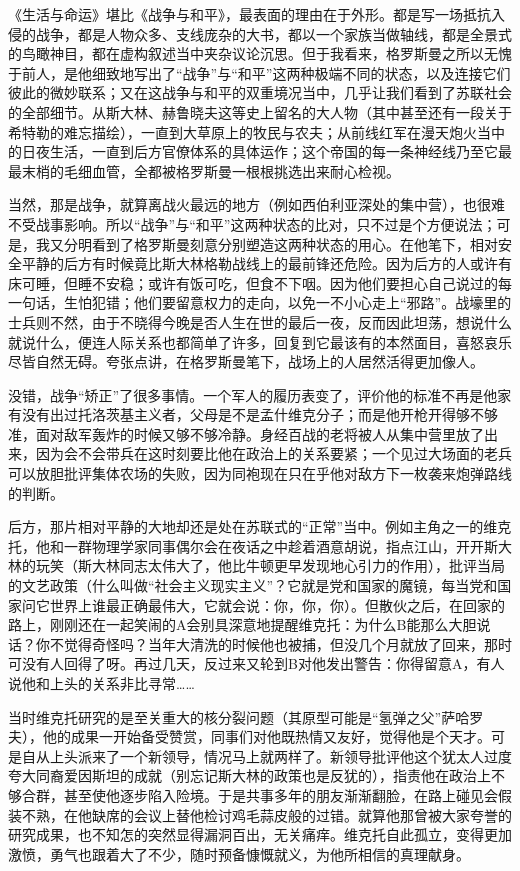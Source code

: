 《生活与命运》堪比《战争与和平》，最表面的理由在于外形。都是写一场抵抗入侵的战争，都是人物众多、支线庞杂的大书，都以一个家族当做轴线，都是全景式的鸟瞰神目，都在虚构叙述当中夹杂议论沉思。但于我看来，格罗斯曼之所以无愧于前人，是他细致地写出了“战争”与“和平”这两种极端不同的状态，以及连接它们彼此的微妙联系；又在这战争与和平的双重境况当中，几乎让我们看到了苏联社会的全部细节。从斯大林、赫鲁晓夫这等史上留名的大人物（其中甚至还有一段关于希特勒的难忘描绘），一直到大草原上的牧民与农夫；从前线红军在漫天炮火当中的日夜生活，一直到后方官僚体系的具体运作；这个帝国的每一条神经线乃至它最最末梢的毛细血管，全都被格罗斯曼一根根挑选出来耐心检视。

当然，那是战争，就算离战火最远的地方（例如西伯利亚深处的集中营），也很难不受战事影响。所以“战争”与“和平”这两种状态的比对，只不过是个方便说法；可是，我又分明看到了格罗斯曼刻意分别塑造这两种状态的用心。在他笔下，相对安全平静的后方有时候竟比斯大林格勒战线上的最前锋还危险。因为后方的人或许有床可睡，但睡不安稳；或许有饭可吃，但食不下咽。因为他们要担心自己说过的每一句话，生怕犯错；他们要留意权力的走向，以免一不小心走上“邪路”。战壕里的士兵则不然，由于不晓得今晚是否人生在世的最后一夜，反而因此坦荡，想说什么就说什么，便连人际关系也都简单了许多，回复到它最该有的本然面目，喜怒哀乐尽皆自然无碍。夸张点讲，在格罗斯曼笔下，战场上的人居然活得更加像人。

没错，战争“矫正”了很多事情。一个军人的履历表变了，评价他的标准不再是他家有没有出过托洛茨基主义者，父母是不是孟什维克分子；而是他开枪开得够不够准，面对敌军轰炸的时候又够不够冷静。身经百战的老将被人从集中营里放了出来，因为会不会带兵在这时刻要比他在政治上的关系要紧；一个见过大场面的老兵可以放胆批评集体农场的失败，因为同袍现在只在乎他对敌方下一枚袭来炮弹路线的判断。

后方，那片相对平静的大地却还是处在苏联式的“正常”当中。例如主角之一的维克托，他和一群物理学家同事偶尔会在夜话之中趁着酒意胡说，指点江山，开开斯大林的玩笑（斯大林同志太伟大了，他比牛顿更早发现地心引力的作用），批评当局的文艺政策（什么叫做“社会主义现实主义”？它就是党和国家的魔镜，每当党和国家问它世界上谁最正确最伟大，它就会说：你，你，你）。但散伙之后，在回家的路上，刚刚还在一起笑闹的A会别具深意地提醒维克托：为什么B能那么大胆说话？你不觉得奇怪吗？当年大清洗的时候他也被捕，但没几个月就放了回来，那时可没有人回得了呀。再过几天，反过来又轮到B对他发出警告：你得留意A，有人说他和上头的关系非比寻常……

当时维克托研究的是至关重大的核分裂问题（其原型可能是“氢弹之父”萨哈罗夫），他的成果一开始备受赞赏，同事们对他既热情又友好，觉得他是个天才。可是自从上头派来了一个新领导，情况马上就两样了。新领导批评他这个犹太人过度夸大同裔爱因斯坦的成就（别忘记斯大林的政策也是反犹的），指责他在政治上不够合群，甚至使他逐步陷入险境。于是共事多年的朋友渐渐翻脸，在路上碰见会假装不熟，在他缺席的会议上替他检讨鸡毛蒜皮般的过错。就算他那曾被大家夸誉的研究成果，也不知怎的突然显得漏洞百出，无关痛痒。维克托自此孤立，变得更加激愤，勇气也跟着大了不少，随时预备慷慨就义，为他所相信的真理献身。

